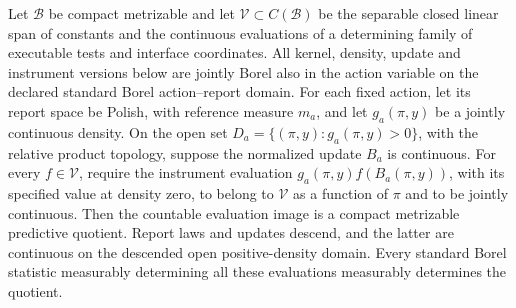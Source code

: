 \begin{proposition}\label{prop:quotient}
Let $\mathcal B$ be compact metrizable and let $\mathcal V\subset C(\mathcal B)$ be the separable closed linear span of constants and the continuous evaluations of a determining family of executable tests and interface coordinates. All kernel, density, update and instrument versions below are jointly Borel also in the action variable on the declared standard Borel action--report domain. For each fixed action, let its report space be Polish, with reference measure $m_a$, and let $g_a(\pi,y)$ be a jointly continuous density. On the open set $D_a=\{(\pi,y):g_a(\pi,y)>0\}$, with the relative product topology, suppose the normalized update $B_a$ is continuous. For every $f\in\mathcal V$, require the instrument evaluation $g_a(\pi,y)f(B_a(\pi,y))$, with its specified value at density zero, to belong to $\mathcal V$ as a function of $\pi$ and to be jointly continuous. Then the countable evaluation image is a compact metrizable predictive quotient. Report laws and updates descend, and the latter are continuous on the descended open positive-density domain. Every standard Borel statistic measurably determining all these evaluations measurably determines the quotient.
\end{proposition}

